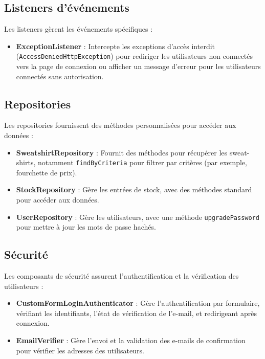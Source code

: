 \documentclass[a4paper,11pt]{article}
\begin{document}
\subsection{Listeners d'événements}
Les listeners gèrent les événements spécifiques :
\begin{itemize}
    \item \textbf{ExceptionListener} : Intercepte les exceptions d'accès interdit (\texttt{AccessDeniedHttpException}) pour rediriger les utilisateurs non connectés vers la page de connexion ou afficher un message d'erreur pour les utilisateurs connectés sans autorisation.
\end{itemize}

\subsection{Repositories}
Les repositories fournissent des méthodes personnalisées pour accéder aux données :
\begin{itemize}
    \item \textbf{SweatshirtRepository} : Fournit des méthodes pour récupérer les sweat-shirts, notamment \texttt{findByCriteria} pour filtrer par critères (par exemple, fourchette de prix).
    \item \textbf{StockRepository} : Gère les entrées de stock, avec des méthodes standard pour accéder aux données.
    \item \textbf{UserRepository} : Gère les utilisateurs, avec une méthode \texttt{upgradePassword} pour mettre à jour les mots de passe hachés.
\end{itemize}

\subsection{Sécurité}
Les composants de sécurité assurent l'authentification et la vérification des utilisateurs :
\begin{itemize}
    \item \textbf{CustomFormLoginAuthenticator} : Gère l'authentification par formulaire, vérifiant les identifiants, l'état de vérification de l'e-mail, et redirigeant après connexion.
    \item \textbf{EmailVerifier} : Gère l'envoi et la validation des e-mails de confirmation pour vérifier les adresses des utilisateurs.
\end{itemize}
\end{document}
